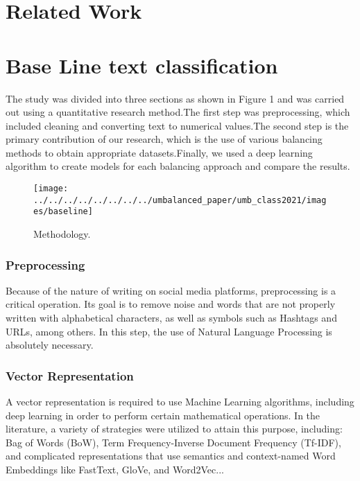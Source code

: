 \documentclass[conference]{IEEEtran}
\begin{document}
	
	\section{Related Work}
	\section{Base Line text classification}
	The study was divided into three sections as shown in Figure 1 and was carried out using a quantitative research method.The first step was preprocessing, which included cleaning and converting text to numerical values.The second step is the primary contribution of our research, which is the use of various balancing methods to obtain appropriate datasets.Finally, we used a deep learning algorithm to create models for each balancing approach and compare the results. 
	
	
	\begin{figure}[htbp]
		\centerline{\texttt{[image: ../../../../../../../../umbalanced\_paper/umb\_class2021/images/baseline]}}
		\caption{Methodology.}
		\label{fig}
	\end{figure}
	
	\subsubsection{Preprocessing}
	Because of the nature of writing on social media platforms, preprocessing is a critical operation. Its goal is to remove noise and words that are not properly written with alphabetical characters, as well as symbols such as Hashtags and URLs, among others. In this step, the use of Natural Language Processing is absolutely necessary. \\
	\subsubsection{Vector Representation}
	A vector representation is required to use Machine Learning algorithms, including deep learning in order to perform certain mathematical operations.  In the literature, a variety of strategies were utilized to attain this purpose, including:
	Bag of Words (BoW), Term Frequency-Inverse Document Frequency (Tf-IDF), and complicated representations that use semantics and context-named Word Embeddings like FastText, GloVe, and Word2Vec...
\end{document}
